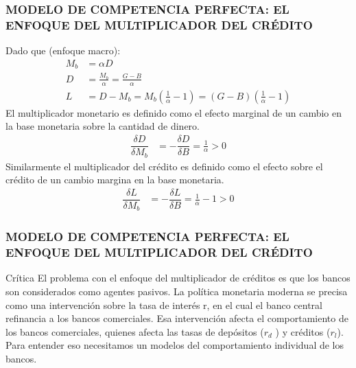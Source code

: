 \documentclass[10pt, xcolor=table, x11names]{beamer}
\begin{document}
\begin{frame}\frametitle{{\normalsize MODELO DE COMPETENCIA PERFECTA: EL ENFOQUE DEL MULTIPLICADOR DEL CRÉDITO} {}}
 Dado que (enfoque macro):
  \begin{align}
  M_{b}&=\alpha D   \\ \nonumber
  D&=\frac{M_{b}}{\alpha}=\frac{G-B}{\alpha}  \\ \nonumber
  L&=D-M_{b}=M_{b}\left(\frac{1}{\alpha}-1 \right)=\left(G-B \right)\left( \frac{1}{\alpha}-1\right)  
  \end{align}   
  El multiplicador monetario es definido como el efecto marginal de un cambio en la base monetaria sobre la cantidad de dinero.  
  \begin{align}
  \dfrac{\delta D}{\delta M_{b}}&=-\dfrac{\delta D}{\delta B}=\frac{1}{\alpha}>0 \nonumber
  \end{align}    
  Similarmente el multiplicador del crédito es definido como el efecto sobre el crédito de un cambio margina en la base monetaria.
  \begin{align}
  \dfrac{\delta L}{\delta M_{b}}&=-\dfrac{\delta L}{\delta B}=\frac{1}{\alpha}-1>0 \nonumber
  \end{align}   
  
\end{frame}




\begin{frame}\frametitle{{\normalsize MODELO DE COMPETENCIA PERFECTA: EL ENFOQUE DEL MULTIPLICADOR DEL CRÉDITO} {}}
   
   \begin{block} {Crítica}
    El problema con el enfoque del multiplicador de créditos es que los bancos son considerados como agentes pasivos. La política monetaria moderna se precisa como una intervención sobre la tasa de interés r, en el cual el banco central refinancia a los bancos comerciales. Esa intervención afecta el comportamiento de los bancos comerciales, quienes afecta las tasas de depósitos ($r_{d}$ ) y créditos ($r_{l}$). Para entender eso necesitamos un modelos del comportamiento individual de los bancos.      
       
   \end{block}	 
    
   
    
\end{frame}
\end{document}
